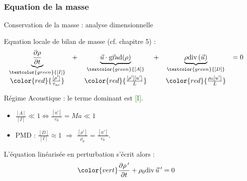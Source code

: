 \subsubsection{Equation de la masse}
\begin{frame}{Conservation de la masse : analyse dimensionnelle}

\small

Equation locale de bilan de masse (cf. chapitre 5) :
\begin{equation}
\begin{array}{cccccc}
   \underbrace{\dpdt{\rho}}_{\textcolor{green}{[I]}} 
   &+&
\underbrace{ \myvec{u} \cdot \gradient(\rho)}_{\textcolor{green}{[A]}}  
 &+& 
   \underbrace{\rho  \divergence (\myvec{u})}_{\textcolor{green}{[D]}}  
   &= 0 \\
    \color{red}{\frac{[\rho']}{\tau_{ac}}}
  &&
   \color{red}{\frac{[\rho'] [u']}{L}}
&&
   \color{red}{\frac{\rho_0[u']}{L}}
\end{array}   
\end{equation}

\pause \bigskip


Régime Acoustique : le terme dominant est \textcolor{green}{[I]}.


\begin{itemize}
\item $\frac{[A]}{[I]}  \ll 1 \Longleftrightarrow \frac{[u']}{c_0} = Ma \ll 1$

\item 
PMD : $\frac{[D]}{[I]} \approx 1$ 
$\Longrightarrow$ $\frac{[\rho']}{\rho_0}  = \frac{[u']}{c_0}$.
\end{itemize}



\bigskip \pause
L'équation linéarisée en perturbation s'écrit alors :
\begin{equation}
	\color{vert}
  \dpdt{\rho\myprime} + \rho_0 \divergence \myvec{u}\myprime = 0
\end{equation}

\vspace{5mm}

\end{frame}

